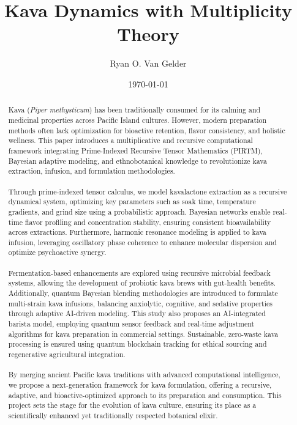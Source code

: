 \documentclass{article}
\theoremstyle{plain}
\theoremstyle{claimstyle}
\begin{document}
\title{Kava Dynamics with Multiplicity Theory}
\author{Ryan O. Van Gelder}
\date{\today}

\maketitle

\begin{abstract}
Kava (\textit{Piper methysticum}) has been traditionally consumed for its calming and medicinal properties across Pacific Island cultures. However, modern preparation methods often lack optimization for bioactive retention, flavor consistency, and holistic wellness. This paper introduces a multiplicative and recursive computational framework integrating Prime-Indexed Recursive Tensor Mathematics (PIRTM), Bayesian adaptive modeling, and ethnobotanical knowledge to revolutionize kava extraction, infusion, and formulation methodologies.

\paragraph{}Through prime-indexed tensor calculus, we model kavalactone extraction as a recursive dynamical system, optimizing key parameters such as soak time, temperature gradients, and grind size using a probabilistic approach. Bayesian networks enable real-time flavor profiling and concentration stability, ensuring consistent bioavailability across extractions. Furthermore, harmonic resonance modeling is applied to kava infusion, leveraging oscillatory phase coherence to enhance molecular dispersion and optimize psychoactive synergy.

\paragraph{}Fermentation-based enhancements are explored using recursive microbial feedback systems, allowing the development of probiotic kava brews with gut-health benefits. Additionally, quantum Bayesian blending methodologies are introduced to formulate multi-strain kava infusions, balancing anxiolytic, cognitive, and sedative properties through adaptive AI-driven modeling. This study also proposes an AI-integrated barista model, employing quantum sensor feedback and real-time adjustment algorithms for kava preparation in commercial settings. Sustainable, zero-waste kava processing is ensured using quantum blockchain tracking for ethical sourcing and regenerative agricultural integration.

\paragraph{}By merging ancient Pacific kava traditions with advanced computational intelligence, we propose a next-generation framework for kava formulation, offering a recursive, adaptive, and bioactive-optimized approach to its preparation and consumption. This project sets the stage for the evolution of kava culture, ensuring its place as a scientifically enhanced yet traditionally respected botanical elixir.

\end{abstract}
\end{document}

